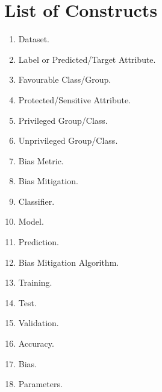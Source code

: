 \documentclass[final,5p,times,twocolumn]{elsarticle}
\begin{document}
\section{List of Constructs}
\label{sec:list_of_constructs}

\begin{enumerate}
	\item Dataset.
	\item Label or Predicted/Target Attribute.
	\item Favourable Class/Group.
	\item Protected/Sensitive Attribute.
	\item Privileged Group/Class.
	\item Unprivileged Group/Class.
	\item Bias Metric.
	\item Bias Mitigation.
	\item Classifier.
	\item Model.
	\item Prediction.
	\item Bias Mitigation Algorithm.
	\item Training.
	\item Test.
	\item Validation.
	\item Accuracy.
	\item Bias.
	\item Parameters.
\end{enumerate}


   
  


%
%
%
\end{document}

